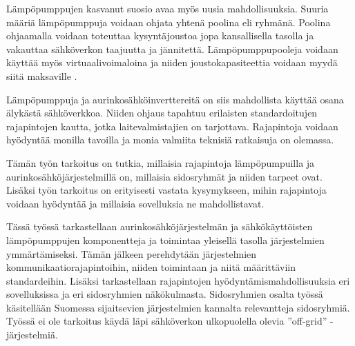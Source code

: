 Lämpöpumppujen kasvanut suosio avaa myös uusia mahdollisuuksia. Suuria määriä lämpöpumppuja voidaan ohjata yhtenä poolina eli ryhmänä. Poolina ohjaamalla voidaan toteuttaa kysyntäjoustoa jopa kansallisella tasolla ja vakauttaa sähköverkon taajuutta ja jännitettä. Lämpöpumppupooleja voidaan käyttää myös virtuaalivoimaloina ja niiden joustokapasiteettia voidaan myydä siitä maksaville \parencite{ShenJiangLi, fischerTriebelSelinger}.

Lämpöpumppuja ja aurinkosähköinverttereitä on siis mahdollista käyttää osana älykästä sähköverkkoa. Niiden ohjaus tapahtuu erilaisten standardoitujen rajapintojen kautta, jotka laitevalmistajien on tarjottava. Rajapintoja voidaan hyödyntää monilla tavoilla ja monia valmiita teknisiä ratkaisuja on olemassa.

Tämän työn tarkoitus on tutkia, millaisia rajapintoja lämpöpumpuilla ja aurinkosähköjärjestelmillä on, millaisia sidosryhmät ja niiden tarpeet ovat. Lisäksi työn tarkoitus on erityisesti vastata kysymykseen, mihin rajapintoja voidaan hyödyntää ja millaisia sovelluksia ne mahdollistavat.

Tässä työssä tarkastellaan aurinkosähköjärjestelmän ja sähkökäyttöisten lämpöpumppujen komponentteja ja toimintaa yleisellä tasolla järjestelmien ymmärtämiseksi. Tämän jälkeen perehdytään järjestelmien kommunikaatiorajapintoihin, niiden toimintaan ja niitä määrittäviin standardeihin. Lisäksi tarkastellaan rajapintojen hyödyntämismahdollisuuksia eri sovelluksissa ja eri sidosryhmien näkökulmasta. Sidosryhmien osalta työssä käsitellään Suomessa sijaitsevien järjestelmien kannalta relevantteja sidosryhmiä. Työssä ei ole tarkoitus käydä läpi sähköverkon ulkopuolella olevia ”off-grid” -järjestelmiä.
